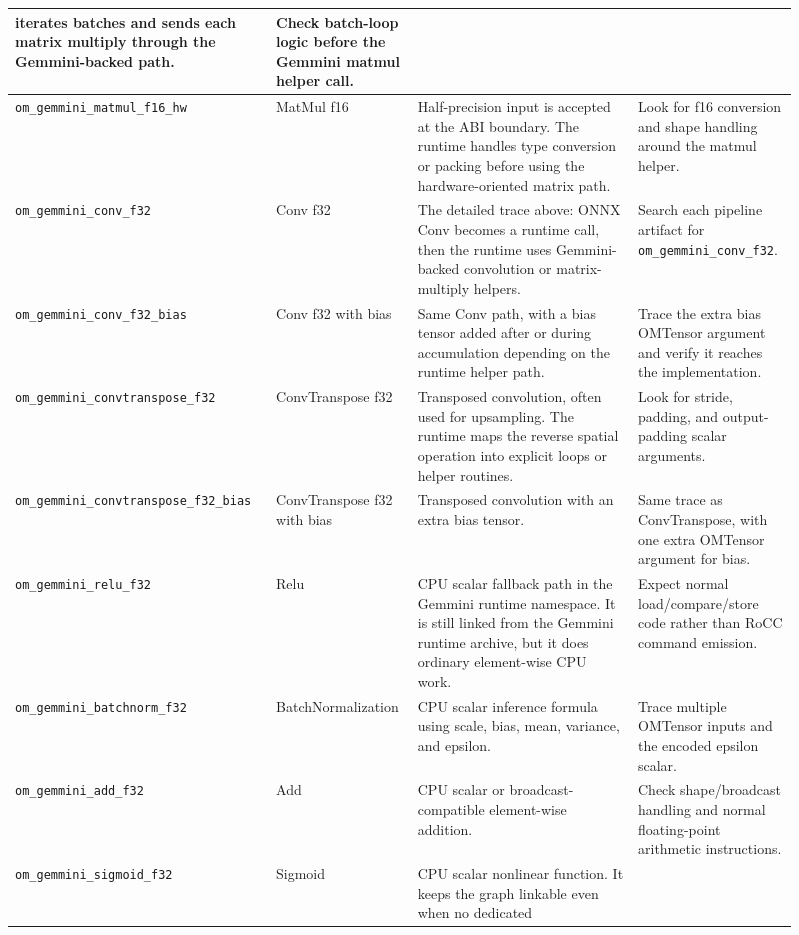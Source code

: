 \documentclass[12pt,a4paper]{article}
\begin{document}
\begin{longtable}{@{}p{0.32\linewidth}p{0.15\linewidth}p{0.27\linewidth}p{0.17\linewidth}@{}}
iterates batches and sends each matrix multiply through the Gemmini-backed path. &
Check batch-loop logic before the Gemmini matmul helper call. \\
\midrule
\texttt{om\_gemmini\_matmul\_f16\_hw} &
MatMul f16 &
Half-precision input is accepted at the ABI boundary. The runtime handles type
conversion or packing before using the hardware-oriented matrix path. &
Look for f16 conversion and shape handling around the matmul helper. \\
\midrule
\texttt{om\_gemmini\_conv\_f32} &
Conv f32 &
The detailed trace above: ONNX Conv becomes a runtime call, then the runtime uses
Gemmini-backed convolution or matrix-multiply helpers. &
Search each pipeline artifact for \texttt{om\_gemmini\_conv\_f32}. \\
\midrule
\texttt{om\_gemmini\_conv\_f32\_bias} &
Conv f32 with bias &
Same Conv path, with a bias tensor added after or during accumulation depending
on the runtime helper path. &
Trace the extra bias OMTensor argument and verify it reaches the implementation. \\
\midrule
\texttt{om\_gemmini\_convtranspose\_f32} &
ConvTranspose f32 &
Transposed convolution, often used for upsampling. The runtime maps the reverse
spatial operation into explicit loops or helper routines. &
Look for stride, padding, and output-padding scalar arguments. \\
\midrule
\texttt{om\_gemmini\_convtranspose\_f32\_bias} &
ConvTranspose f32 with bias &
Transposed convolution with an extra bias tensor. &
Same trace as ConvTranspose, with one extra OMTensor argument for bias. \\
\midrule
\texttt{om\_gemmini\_relu\_f32} &
Relu &
CPU scalar fallback path in the Gemmini runtime namespace. It is still linked
from the Gemmini runtime archive, but it does ordinary element-wise CPU work. &
Expect normal load/compare/store code rather than RoCC command emission. \\
\midrule
\texttt{om\_gemmini\_batchnorm\_f32} &
BatchNormalization &
CPU scalar inference formula using scale, bias, mean, variance, and epsilon. &
Trace multiple OMTensor inputs and the encoded epsilon scalar. \\
\midrule
\texttt{om\_gemmini\_add\_f32} &
Add &
CPU scalar or broadcast-compatible element-wise addition. &
Check shape/broadcast handling and normal floating-point arithmetic instructions. \\
\midrule
\texttt{om\_gemmini\_sigmoid\_f32} &
Sigmoid &
CPU scalar nonlinear function. It keeps the graph linkable even when no dedicated

\end{longtable}
\end{document}
